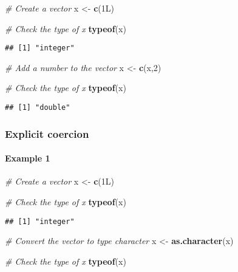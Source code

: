 \documentclass[
]{article}
\newenvironment{Shaded}{\begin{snugshade}}{\end{snugshade}}
\newcommand{\CommentTok}[1]{\textcolor[rgb]{0.56,0.35,0.01}{\textit{#1}}}
\newcommand{\DecValTok}[1]{\textcolor[rgb]{0.00,0.00,0.81}{#1}}
\newcommand{\FunctionTok}[1]{\textcolor[rgb]{0.13,0.29,0.53}{\textbf{#1}}}
\newcommand{\NormalTok}[1]{#1}
\newcommand{\OtherTok}[1]{\textcolor[rgb]{0.56,0.35,0.01}{#1}}
\begin{document}
\begin{Shaded}
\begin{Highlighting}[]
\CommentTok{\# Create a vector}
\NormalTok{x }\OtherTok{\textless{}{-}} \FunctionTok{c}\NormalTok{(1L)}

\CommentTok{\# Check the type of x}
\FunctionTok{typeof}\NormalTok{(x)}
\end{Highlighting}
\end{Shaded}

\begin{verbatim}
## [1] "integer"
\end{verbatim}

\begin{Shaded}
\begin{Highlighting}[]
\CommentTok{\# Add a number to the vector}
\NormalTok{x }\OtherTok{\textless{}{-}} \FunctionTok{c}\NormalTok{(x,}\DecValTok{2}\NormalTok{)}

\CommentTok{\# Check the type of x}
\FunctionTok{typeof}\NormalTok{(x)}
\end{Highlighting}
\end{Shaded}

\begin{verbatim}
## [1] "double"
\end{verbatim}

\hypertarget{explicit-coercion}{%
\subsubsection{Explicit coercion}\label{explicit-coercion}}

\hypertarget{example-1-1}{%
\paragraph{Example 1}\label{example-1-1}}

\begin{Shaded}
\begin{Highlighting}[]
\CommentTok{\# Create a vector}
\NormalTok{x }\OtherTok{\textless{}{-}} \FunctionTok{c}\NormalTok{(1L)}

\CommentTok{\# Check the type of x}
\FunctionTok{typeof}\NormalTok{(x)}
\end{Highlighting}
\end{Shaded}

\begin{verbatim}
## [1] "integer"
\end{verbatim}

\begin{Shaded}
\begin{Highlighting}[]
\CommentTok{\# Convert the vector to type character}
\NormalTok{x }\OtherTok{\textless{}{-}} \FunctionTok{as.character}\NormalTok{(x)}

\CommentTok{\# Check the type of x}
\FunctionTok{typeof}\NormalTok{(x)}
\end{Highlighting}
\end{Shaded}
\end{document}
